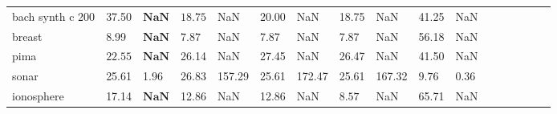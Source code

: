 \begin{table}[h!]
\begin{center}
\begin{tabular}{l | r r r r r r r r r r r r r r r r}
bach synth c 200 & \multicolumn{1}{l|}{37.50} & \multicolumn{1}{l|}{ $\mathbf{ NaN}$ } & \multicolumn{1}{l|}{ $\mathbf{18.75}$ } & \multicolumn{1}{l|}{ NaN} & \multicolumn{1}{l|}{20.00} & \multicolumn{1}{l|}{ NaN} & \multicolumn{1}{l|}{18.75} & \multicolumn{1}{l|}{ NaN} & \multicolumn{1}{l|}{41.25} & \multicolumn{1}{l|}{ NaN} \\
breast & \multicolumn{1}{l|}{8.99} & \multicolumn{1}{l|}{ $\mathbf{ NaN}$ } & \multicolumn{1}{l|}{ $\mathbf{7.87}$ } & \multicolumn{1}{l|}{ NaN} & \multicolumn{1}{l|}{7.87} & \multicolumn{1}{l|}{ NaN} & \multicolumn{1}{l|}{7.87} & \multicolumn{1}{l|}{ NaN} & \multicolumn{1}{l|}{56.18} & \multicolumn{1}{l|}{ NaN} \\
pima & \multicolumn{1}{l|}{ $\mathbf{22.55}$ } & \multicolumn{1}{l|}{ $\mathbf{ NaN}$ } & \multicolumn{1}{l|}{26.14} & \multicolumn{1}{l|}{ NaN} & \multicolumn{1}{l|}{27.45} & \multicolumn{1}{l|}{ NaN} & \multicolumn{1}{l|}{26.47} & \multicolumn{1}{l|}{ NaN} & \multicolumn{1}{l|}{41.50} & \multicolumn{1}{l|}{ NaN} \\
sonar & \multicolumn{1}{l|}{25.61} & \multicolumn{1}{l|}{1.96} & \multicolumn{1}{l|}{26.83} & \multicolumn{1}{l|}{157.29} & \multicolumn{1}{l|}{25.61} & \multicolumn{1}{l|}{172.47} & \multicolumn{1}{l|}{25.61} & \multicolumn{1}{l|}{167.32} & \multicolumn{1}{l|}{ $\mathbf{9.76}$ } & \multicolumn{1}{l|}{ $\mathbf{0.36}$ } \\
ionosphere & \multicolumn{1}{l|}{17.14} & \multicolumn{1}{l|}{ $\mathbf{ NaN}$ } & \multicolumn{1}{l|}{12.86} & \multicolumn{1}{l|}{ NaN} & \multicolumn{1}{l|}{12.86} & \multicolumn{1}{l|}{ NaN} & \multicolumn{1}{l|}{ $\mathbf{8.57}$ } & \multicolumn{1}{l|}{ NaN} & \multicolumn{1}{l|}{65.71} & \multicolumn{1}{l|}{ NaN} \\
\end{tabular}
\end{center}
\end{table}
